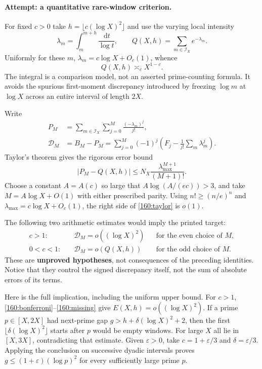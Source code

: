 \documentclass[11pt,a4paper]{article}
\newcommand{\dd}{\,\mathrm d}
\numberwithin{equation}{section}
\begin{document}
\paragraph{Attempt: a quantitative rare-window criterion.}
For fixed $c>0$ take $h=\lfloor c(\log X)^2\rfloor$ and use the varying
local intensity
\[
 \lambda_m=\int_m^{m+h}\frac{\dd t}{\log t},\qquad
 Q(X,h)=\sum_{m\in\mathcal I_X}e^{-\lambda_m}.
\]
Uniformly for these $m$,
$\lambda_m=c\log X+O_c(1)$, whence
\begin{equation}\label{160:poisson-scale}
 Q(X,h)\asymp_c X^{1-c}.
\end{equation}
The integral is a comparison model, not an asserted prime-counting formula.
It avoids the spurious first-moment discrepancy introduced by freezing
$\log m$ at $\log X$ across an entire interval of length $2X$.

Write
\begin{align}
 P_M&=\sum_{m\in\mathcal I_X}\sum_{j=0}^M
             \frac{(-\lambda_m)^j}{j!},\\
 \mathcal D_M&=B_M-P_M
 =\sum_{j=0}^M(-1)^j
   \left(F_j-\frac1{j!}\sum_m\lambda_m^j\right).
 \label{160:signed-discrepancy}
\end{align}
Taylor's theorem gives the rigorous error bound
\begin{equation}\label{160:taylor}
 |P_M-Q(X,h)|\le
 N_X\frac{\lambda_{\max}^{M+1}}{(M+1)!}.
\end{equation}
Choose a constant $A=A(c)$ so large that
$A\log(A/(ec))>3$, and take $M=A\log X+O(1)$ with either prescribed
parity. Using $n!\ge(n/e)^n$ and
$\lambda_{\max}=c\log X+O_c(1)$, the right side of
\eqref{160:taylor} is $o(1)$.

The following two arithmetic estimates would imply the printed target:
\begin{equation}\label{160:missing}
 \begin{aligned}
 c>1:&\quad \mathcal D_M=o((\log X)^2)
       &&\text{for the even choice of }M,\\
 0<c<1:&\quad \mathcal D_M=o(Q(X,h))
       &&\text{for the odd choice of }M.
 \end{aligned}
\end{equation}
These are \textbf{unproved hypotheses}, not consequences of the preceding
identities. Notice that they control the signed discrepancy itself, not
the sum of absolute errors of its terms.

Here is the full implication, including the uniform upper bound. For
$c>1$, \eqref{160:bonferroni}--\eqref{160:missing} give
$E(X,h)=o((\log X)^2)$. If a prime $p\in[X,2X]$ had next-prime gap
$g>h+\delta(\log X)^2+2$, then the first
$\lfloor\delta(\log X)^2\rfloor$ starts after $p$ would be empty windows.
For large $X$ all lie in $[X,3X]$, contradicting that estimate. Given
$\varepsilon>0$, take $c=1+\varepsilon/3$ and
$\delta=\varepsilon/3$. Applying the conclusion on successive dyadic
intervals proves $g\le(1+\varepsilon)(\log p)^2$ for every sufficiently
large prime $p$.
\end{document}
